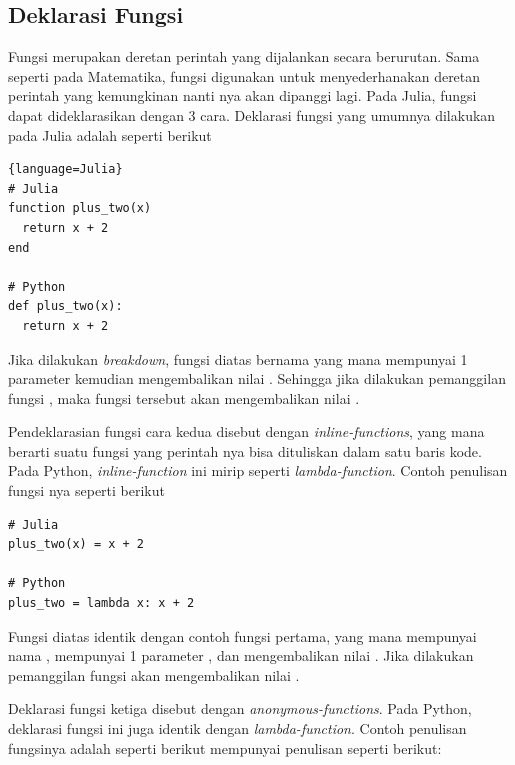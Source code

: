 

\subsection{Deklarasi Fungsi}

Fungsi merupakan deretan perintah yang dijalankan secara berurutan. Sama
seperti pada Matematika, fungsi digunakan untuk menyederhanakan deretan
perintah yang kemungkinan nanti nya akan dipanggi lagi. Pada Julia, fungsi
dapat dideklarasikan dengan 3 cara. Deklarasi fungsi yang umumnya dilakukan
pada Julia adalah seperti berikut

\begin{lstlisting}[label={contoh deklarasi fungsi 1}]{language=Julia}
# Julia
function plus_two(x)
  return x + 2
end

# Python
def plus_two(x):
  return x + 2
\end{lstlisting}

\noindent
Jika dilakukan \emph{breakdown}, fungsi diatas bernama  yang mana mempunyai
1 parameter  kemudian mengembalikan nilai . Sehingga jika
dilakukan pemanggilan fungsi , maka fungsi tersebut akan
mengembalikan nilai .

Pendeklarasian fungsi cara kedua disebut dengan \emph{inline-functions}, yang
mana berarti suatu fungsi yang perintah nya bisa dituliskan dalam satu baris
kode. Pada Python, \emph{inline-function} ini mirip seperti
\emph{lambda-function}. Contoh penulisan fungsi nya seperti berikut

\begin{lstlisting}[label={contoh deklarasi fungsi 2}]
# Julia
plus_two(x) = x + 2

# Python
plus_two = lambda x: x + 2
\end{lstlisting}

\noindent
Fungsi diatas identik dengan contoh fungsi pertama, yang mana mempunyai nama ,
mempunyai 1 parameter , dan mengembalikan nilai . Jika dilakukan
pemanggilan fungsi  akan mengembalikan nilai .

Deklarasi fungsi ketiga disebut dengan \emph{anonymous-functions}. Pada Python,
deklarasi fungsi ini juga identik dengan \emph{lambda-function}. Contoh
penulisan fungsinya adalah seperti berikut mempunyai penulisan seperti berikut:

